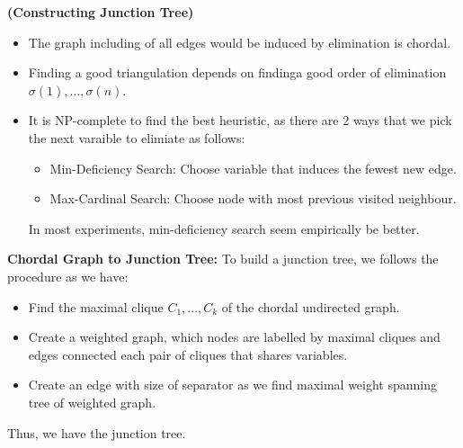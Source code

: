 \begin{definition}{\textbf{(Constructing Junction Tree)}}
    \begin{itemize}
        \item The graph including of all edges would be induced by elimination is chordal. 
        \item Finding a good triangulation depends on findinga good order of elimination $\sigma(1),\dots,\sigma(n)$. 
        \item It is NP-complete to find the best heuristic, as there are $2$ ways that we pick the next varaible to elimiate as follows:
        \begin{itemize}
            \item Min-Deficiency Search: Choose variable that induces the fewest new edge. 
            \item Max-Cardinal Search: Choose node with most previous visited neighbour.
        \end{itemize}
        In most experiments, min-deficiency search seem empirically be better. 
    \end{itemize}
    \textbf{Chordal Graph to Junction Tree:} To build a junction tree, we follows the procedure as we have:
    \begin{itemize}
        \item Find the maximal clique $C_1,\dots,C_k$ of the chordal undirected graph. 
        \item Create a weighted graph, which nodes are labelled by maximal cliques and edges connected each pair of cliques that shares variables. 
        \item Create an edge with size of separator as we find maximal weight spanning tree of weighted graph. 
    \end{itemize}
    Thus, we have the junction tree.
\end{definition}

